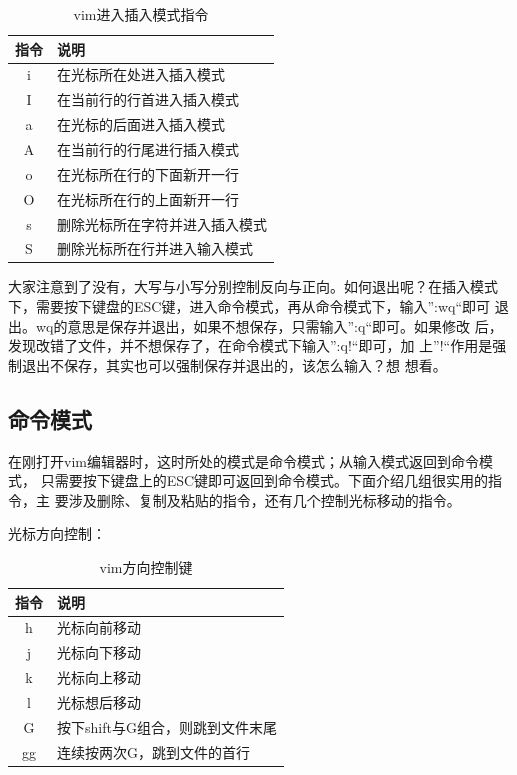 \begin{table}[h]
  \centering
    \begin{tabular}{cl}
      \toprule
      指令  & 说明 \\
      \midrule
      i     & 在光标所在处进入插入模式 \\
      I     & 在当前行的行首进入插入模式 \\
      a     & 在光标的后面进入插入模式 \\
      A     & 在当前行的行尾进行插入模式 \\
      o     & 在光标所在行的下面新开一行 \\
      O     & 在光标所在行的上面新开一行 \\
      s     & 删除光标所在字符并进入插入模式 \\
      S     & 删除光标所在行并进入输入模式 \\
      \bottomrule
    \end{tabular}
    \caption{vim进入插入模式指令}
    \label{tab:vimInsertMode}
\end{table}

大家注意到了没有，大写与小写分别控制反向与正向。如何退出呢？在插入模式
下，需要按下键盘的ESC键，进入命令模式，再从命令模式下，输入”:wq“即可
退出。wq的意思是保存并退出，如果不想保存，只需输入”:q“即可。如果修改
后，发现改错了文件，并不想保存了，在命令模式下输入”:q!“即可，加
上”!“作用是强制退出不保存，其实也可以强制保存并退出的，该怎么输入？想
想看。

\subsection{命令模式}

在刚打开vim编辑器时，这时所处的模式是命令模式；从输入模式返回到命令模式，
只需要按下键盘上的ESC键即可返回到命令模式。下面介绍几组很实用的指令，主
要涉及删除、复制及粘贴的指令，还有几个控制光标移动的指令。

光标方向控制：

\begin{table}[h]
  \centering
    \begin{tabular}{cl}
      \toprule
      指令  & 说明 \\
      \midrule
      h    & 光标向前移动 \\
      j  & 光标向下移动 \\
      k  & 光标向上移动 \\
      l  & 光标想后移动 \\
      G  & 按下shift与G组合，则跳到文件末尾 \\
      gg & 连续按两次G，跳到文件的首行 \\
      \bottomrule
    \end{tabular}
    \caption{vim方向控制键}
    \label{tab:vimFangxiang}
\end{table}

